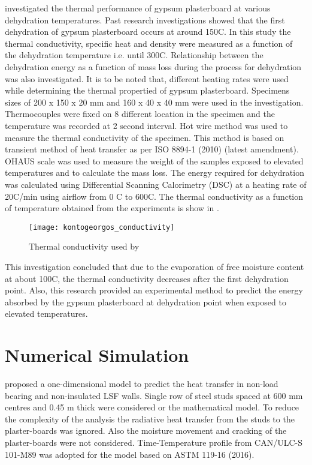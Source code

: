 \citet{Kontogeorgos2011} investigated the thermal performance of gypsum plasterboard at various dehydration temperatures. Past research investigations showed that the first dehydration of gypsum plasterboard occurs at around 150\degree C. In this study the thermal conductivity, specific heat and density were measured as a function of the dehydration temperature i.e. until 300\degree C. Relationship between the dehydration energy as a function of mass loss during the process for dehydration was also investigated. It is to be noted that, different heating rates were used while determining the thermal propertied of gypsum plasterboard. Specimens sizes of 200 x 150 x 20 mm and 160 x 40 x 40 mm were used in the investigation. Thermocouples were fixed on 8 different location in the specimen and the temperature was recorded at 2 second interval. Hot wire method was used to measure the thermal conductivity of the specimen. This method is based on transient method of heat transfer as per ISO 8894-1 (2010) (latest amendment). OHAUS scale was used to measure the weight of the samples exposed to elevated temperatures and to calculate the mass loss. The energy required for dehydration was calculated using Differential Scanning Calorimetry (DSC) at a heating rate of 20\degree C/min using airflow from 0 \degree C to 600\degree C. The thermal conductivity as a function of temperature obtained from the experiments is show in .
\begin{figure}[htbp]
	\centering
		\texttt{[image: kontogeorgos\_conductivity]}		
		\caption{Thermal conductivity used by \citet{Kontogeorgos2011}}
		\label{fig:kontogeorgos_conductivity}
\end{figure}

This investigation concluded that due to the evaporation of free moisture content at about 100\degree C, the thermal conductivity decreases after the first dehydration point. Also, this research provided an experimental method to predict the energy absorbed by the gypsum plasterboard at dehydration point when exposed to elevated temperatures.

\section{Numerical Simulation}

\citet{Sultan1996} proposed a one-dimensional model to predict the heat transfer in non-load bearing and non-insulated LSF walls. Single row of steel studs spaced at 600 mm centres and 0.45 m thick were considered or the mathematical model. To reduce the complexity of the analysis the radiative heat transfer from the studs to the plaster-boards was ignored. Also the moisture movement and cracking of the plaster-boards were not considered. Time-Temperature profile from CAN/ULC-S 101-M89 was adopted for the model based on ASTM 119-16 (2016).

